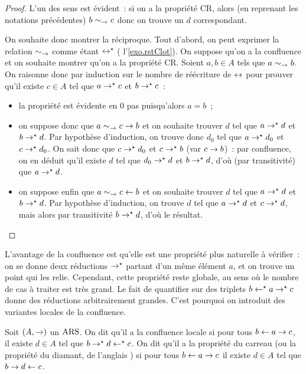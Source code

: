 \begin{proof}
  L'un des sens est évident~: si on a la propriété CR, alors (en reprenant les
  notations précédentes) $b \sim_{\mathord{\mathrel{\to}}} c$ donc on trouve un $d$ correspondant.

  On souhaite donc montrer la réciproque. Tout d'abord, on peut exprimer la
  relation $\sim_{\mathord{\mathrel{\to}}}$ comme étant $\mathrel{\leftrightarrow}^{\mathord{\star}}$ (
  l'\cref{exo.rstClot}). On suppose qu'on a la confluence et on souhaite
  montrer qu'on a la propriété CR. Soient $a,b \in A$ tels que $a\sim_{\mathord{\mathrel{\to}}} b$.
  On raisonne donc par induction sur le nombre de réécriture de $\mathrel{\leftrightarrow}$
  pour prouver qu'il existe $c \in A$ tel que $a \mathrel{\to}^{\mathord{\star}} c$ et $b\mathrel{\to}^{\mathord{\star}} c$~:
  \begin{itemize}
  \item la propriété est évidente en $0$ pas puisqu'alors $a = b$~;
  \item on suppose donc que $a \sim_{\mathord{\mathrel{\to}}} c \mathrel{\to} b$ et on souhaite trouver
    $d$ tel que $a \mathrel{\to}^{\mathord{\star}} d$ et $b \mathrel{\to}^{\mathord{\star}} d$. Par hypothèse d'induction,
    on trouve donc $d_0$ tel que $a \mathrel{\to}^{\mathord{\star}} d_0$ et $c \mathrel{\to}^{\mathord{\star}} d_0$. On
    sait donc que $c \mathrel{\to}^{\mathord{\star}} d_0$ et $c\mathrel{\to}^{\mathord{\star}} b$ (var $c \mathrel{\to} b$)~:
    par confluence, on en déduit qu'il existe $d$ tel que $d_0 \mathrel{\to}^{\mathord{\star}} d$
    et $b\mathrel{\to}^{\mathord{\star}} d$, d'où (par transitivité) que $a\mathrel{\to}^{\mathord{\star}} d$.
  \item on suppose enfin que $a \sim_{\mathord{\mathrel{\to}}} c \mathrel{\leftarrow} b$ et on souhaite
    trouver $d$ tel que $a\mathrel{\to}^{\mathord{\star}} d$ et $b \mathrel{\to}^{\mathord{\star}} d$. Par hypothèse
    d'induction, on trouve $d$ tel que $a\mathrel{\to}^{\mathord{\star}} d$ et $c\mathrel{\to}^{\mathord{\star}} d$,
    mais alors par transitivité $b\mathrel{\to}^{\mathord{\star}} d$, d'où le résultat.\qedhere
  \end{itemize}
\end{proof}

L'avantage de la confluence est qu'elle est une propriété plus naturelle à
vérifier~: on se donne deux réductions $\mathrel{\to}^{\mathord{\star}}$ partant d'un même élément
$a$, et on trouve un point qui les relie. Cependant, cette propriété reste
globale, au sens où le nombre de cas à traiter est très grand. Le fait de
quantifier sur des triplets $b\mathrel{\leftarrow}^{\mathord{\star}} a \mathrel{\to}^{\mathord{\star}} c$ donne des réductions
arbitrairement grandes. C'est pourquoi on introduit des variantes locales
de la confluence.

\begin{definition}
  Soit $(A,\mathrel{\to})$ un $\operatorname{ARS}$. On dit qu'il a la confluence locale si pour tous
  $b \mathrel{\leftarrow} a \mathrel{\to} c$, il existe $d \in A$ tel que
  $b \mathrel{\to}^{\mathord{\star}} d \mathrel{\leftarrow}^{\mathord{\star}} c$.
  On dit qu'il a la propriété du carreau (ou la propriété du diamant, de
  l'anglais ) si pour tous
  $b \mathrel{\leftarrow} a \mathrel{\to} c$ il existe $d \in A$ tel que
  $b \mathrel{\to} d \mathrel{\leftarrow} c$.
\end{definition}

